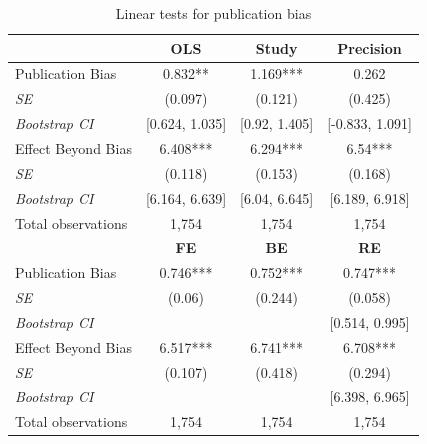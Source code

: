 \begin{table}[!t]
  \centering
  \footnotesize
  \singlespace
  \caption{Linear tests for publication bias}
  \label{tab:PB-FAT}
  \begin{tabular}{
  @{\hskip\tabcolsep\extracolsep}
  l*{3}{c}} %
  \toprule
    \multicolumn{1}{l}{} &
    \multicolumn{1}{c}{\textbf{OLS}} & 
    \multicolumn{1}{c}{\textbf{Study}} &
    \multicolumn{1}{c}{\textbf{Precision}} \\
  \midrule
  
  Publication Bias & 0.832** &  1.169*** & 0.262 \\
  \emph{\hspace{0.2cm}SE} & (0.097) & (0.121) & (0.425) \\
  \emph{\hspace{0.2cm}Bootstrap CI} & [0.624, 1.035] & [0.92, 1.405] & [-0.833, 1.091] \\
  \addlinespace[0.5em]
  Effect Beyond Bias & 6.408*** & 6.294*** & 6.54*** \\
  \emph{\hspace{0.2cm}SE} & (0.118) &  (0.153) & (0.168) \\
  \emph{\hspace{0.2cm}Bootstrap CI} & [6.164, 6.639] & [6.04, 6.645] & [6.189, 6.918] \\
  \addlinespace[0.5em]
  Total observations & 1,754 & 1,754 & 1,754 \\

  \midrule
    \multicolumn{1}{l}{} &
    \multicolumn{1}{c}{\textbf{FE}} &
    \multicolumn{1}{c}{\textbf{BE}} &
    \multicolumn{1}{c}{\textbf{RE}} \\
  \midrule

  Publication Bias & 0.746*** & 0.752*** & 0.747*** \\
  \emph{\hspace{0.2cm}SE} & (0.06) & (0.244) & (0.058) \\
  \emph{\hspace{0.2cm}Bootstrap CI} &  &  & [0.514, 0.995] \\
  \addlinespace[0.5em]
  Effect Beyond Bias & 6.517*** & 6.741*** & 6.708*** \\ 
  \emph{\hspace{0.2cm}SE} & (0.107) & (0.418) & (0.294) \\
  \emph{\hspace{0.2cm}Bootstrap CI} &   &  & [6.398, 6.965] \\
  \addlinespace[0.5em]
  Total observations & 1,754 & 1,754 & 1,754 \\
      

\end{tabular}
\end{table}
